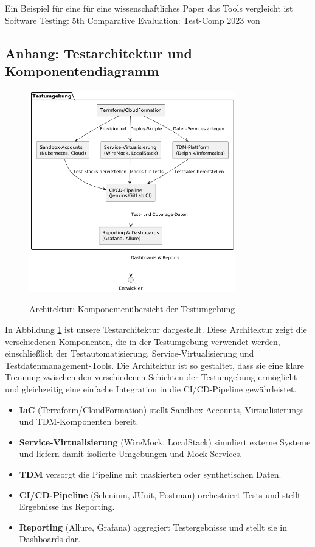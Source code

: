 Ein Beispiel für eine für eine wissenschaftliches Paper das Tools vergleicht ist Software Testing:
5th Comparative Evaluation: {Test-Comp 2023} von \cite{beyer2023}

\newpage

\subsection{Anhang: Testarchitektur und Komponentendiagramm}

\begin{figure}[h!]
\centering
\caption{Architektur: Komponentenübersicht der Testumgebung}
    \includegraphics[width=0.8\textwidth]{fig/test_architecture_enviroment.png}
    \label{fig:architecture}
\end{figure} 

In Abbildung \ref{fig:architecture} ist unsere Testarchitektur dargestellt.
Diese Architektur zeigt die verschiedenen Komponenten, die in der Testumgebung verwendet werden,
einschließlich der Testautomatisierung, Service-Virtualisierung und Testdatenmanagement-Tools.
Die Architektur ist so gestaltet, dass sie eine klare Trennung zwischen den verschiedenen Schichten
der Testumgebung ermöglicht und gleichzeitig eine einfache Integration in die CI/CD-Pipeline
gewährleistet.

\begin{itemize}
    \item \textbf{IaC}  (Terraform/CloudFormation) stellt Sandbox-Accounts, Virtualisierungs-
    und TDM-Komponenten bereit.
    \item \textbf{Service-Virtualisierung} (WireMock, LocalStack) simuliert externe Systeme und
    liefern damit isolierte Umgebungen und Mock-Services.
    \item \textbf{TDM} versorgt die Pipeline mit maskierten oder synthetischen Daten.
    \item \textbf{CI/CD-Pipeline} (Selenium, JUnit, Postman) orchestriert Tests und stellt
    Ergebnisse ins Reporting.
    \item \textbf{Reporting} (Allure, Grafana) aggregiert Testergebnisse und stellt sie in
    Dashboards dar.
\end{itemize}

